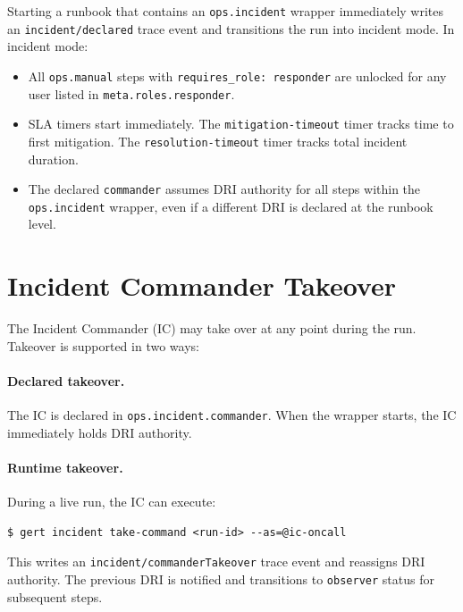 Starting a runbook that contains an \texttt{ops.incident} wrapper immediately writes an
\texttt{incident/declared} trace event and transitions the run into incident mode. In
incident mode:

\begin{itemize}
  \item All \texttt{ops.manual} steps with \texttt{requires\_role: responder} are unlocked
    for any user listed in \texttt{meta.roles.responder}.
  \item SLA timers start immediately. The \texttt{mitigation-timeout} timer tracks time to
    first mitigation. The \texttt{resolution-timeout} timer tracks total incident duration.
  \item The declared \texttt{commander} assumes DRI authority for all steps within the
    \texttt{ops.incident} wrapper, even if a different DRI is declared at the runbook level.
\end{itemize}

\section{Incident Commander Takeover}
\label{sec:ir-commander-takeover}

The Incident Commander (IC) may take over at any point during the run. Takeover is
supported in two ways:

\paragraph{Declared takeover.} The IC is declared in \texttt{ops.incident.commander}. When
the wrapper starts, the IC immediately holds DRI authority.

\paragraph{Runtime takeover.} During a live run, the IC can execute:

\begin{verbatim}
$ gert incident take-command <run-id> --as=@ic-oncall
\end{verbatim}

This writes an \texttt{incident/commanderTakeover} trace event and reassigns DRI authority.
The previous DRI is notified and transitions to \texttt{observer} status for subsequent steps.

